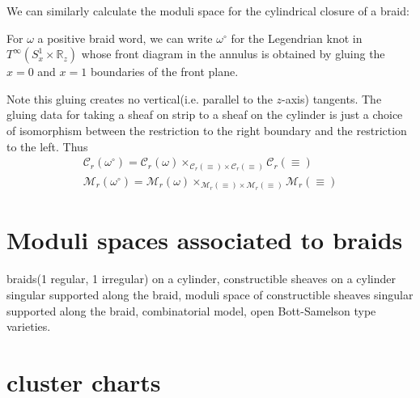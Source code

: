We can similarly calculate the moduli space for the cylindrical closure of a braid:
\begin{definition}
	For $\omega$ a positive braid word, we can write $\omega^{\circ}$ for the Legendrian knot in $T^{\infty}(S^1_x \times \mathbb{R}_z)$ whose front diagram in the annulus is obtained by gluing the $x=0$ and $x=1$ boundaries of the front plane.
\end{definition}

	Note this gluing creates no vertical(i.e. parallel to the $z$-axis) tangents. The gluing data for taking a sheaf on strip to a sheaf on the cylinder is just a choice of isomorphism between the restriction to the right boundary and the restriction to the left. Thus
\begin{align}
		\mathcal{C}_r(\omega^{\circ})=\mathcal{C}_r(\omega)\times_{\mathcal{C}_r(\equiv)\times\mathcal{C}_r(\equiv)}\mathcal{C}_r(\equiv)\\
		\mathcal{M}_r(\omega^{\circ})=\mathcal{M}_r(\omega)\times_{\mathcal{M}_r(\equiv)\times\mathcal{M}_r(\equiv)}\mathcal{M}_r(\equiv)
\end{align}
  

\section{Moduli spaces associated to braids}

    braids(1 regular, 1 irregular) on a cylinder, constructible sheaves on a cylinder singular supported along the braid, moduli space of constructible sheaves singular supported along the braid, combinatorial model, open Bott-Samelson type varieties.
\section{cluster charts}
